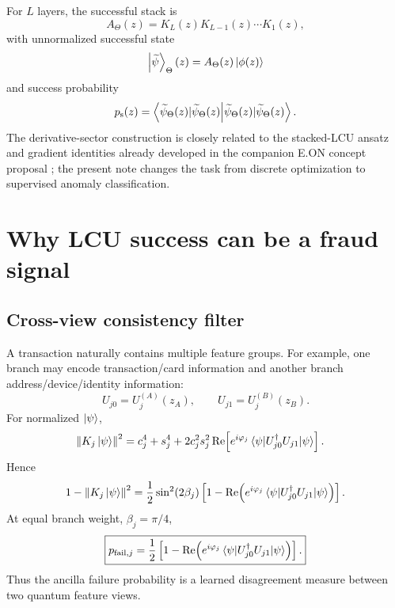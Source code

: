 \documentclass[11pt,a4paper]{article}
\newcommand{\psucc}{p_{\mathrm{s}}}
\newcommand{\kettildepsi}{\ket{\widetilde\psi}}
\begin{document}
For $L$ layers, the successful stack is
\begin{equation}
A_\Theta(z)=K_L(z)K_{L-1}(z)\cdots K_1(z),
\end{equation}
with unnormalized successful state
\begin{equation}
    \kettildepsi_\Theta(z)=A_\Theta(z)\ket{\phi(z)}
\end{equation}
and success probability
\begin{equation}
    \psucc(z)=\braket{\widetilde\psi_\Theta(z)|\widetilde\psi_\Theta(z)}.
\end{equation}
The derivative-sector construction is closely related to the stacked-LCU ansatz and gradient identities already developed in the companion E.ON concept proposal \cite{NguyenEON2026}; the present note changes the task from discrete optimization to supervised anomaly classification.

\section{Why LCU success can be a fraud signal}

\subsection{Cross-view consistency filter}

A transaction naturally contains multiple feature groups. For example, one branch may encode transaction/card information and another branch address/device/identity information:
\begin{equation}
    U_{j0}=U_j^{(A)}(z_A),\qquad U_{j1}=U_j^{(B)}(z_B).
\end{equation}
For normalized $\ket{\psi}$,
\begin{align}
\norm{K_j\ket{\psi}}^2
={}&c_j^4+s_j^4
+2c_j^2s_j^2
\operatorname{Re}\!\left[
 e^{i\varphi_j}
 \mel{\psi}{U_{j0}^\dagger U_{j1}}{\psi}
\right].
\end{align}
Hence
\begin{equation}
1-\norm{K_j\ket{\psi}}^2
=
\frac{1}{2}\sin^2(2\beta_j)
\left[
1-
\operatorname{Re}\!\left(
 e^{i\varphi_j}
 \mel{\psi}{U_{j0}^\dagger U_{j1}}{\psi}
\right)
\right].
\end{equation}
At equal branch weight, $\beta_j=\pi/4$,
\begin{equation}
\boxed{
 p_{\mathrm{fail},j}
 =\frac{1}{2}\left[
1-
\operatorname{Re}\!\left(
 e^{i\varphi_j}
 \mel{\psi}{U_{j0}^\dagger U_{j1}}{\psi}
\right)
\right].
}
\label{eq:disagreement}
\end{equation}
Thus the ancilla failure probability is a learned disagreement measure between two quantum feature views.
\end{document}
